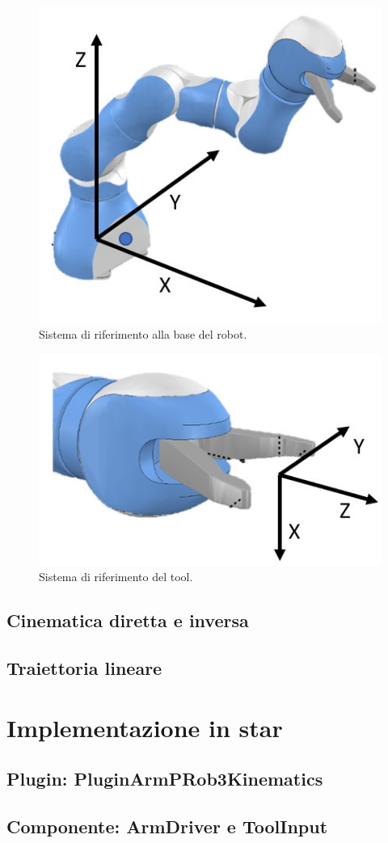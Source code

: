 \begin{figure}[tbh]
	\centering
	\includegraphics[width=0.5\linewidth]{./ImageFiles/prob_frame_base}
	\caption{Sistema di riferimento alla base del robot.}
	\label{fig:base_frame}
\end{figure}

\begin{figure}[tbh]
	\centering
	\includegraphics[width=0.5\linewidth]{./ImageFiles/prob_frame_tool.jpg}
	\caption{Sistema di riferimento del tool.}
	\label{fig:tool_frame}
\end{figure}

\section{Cinematica diretta e inversa}
\section{Traiettoria lineare}

\chapter{Implementazione in star} 
\section{Plugin: PluginArmPRob3Kinematics}
\section{Componente: ArmDriver e ToolInput}
